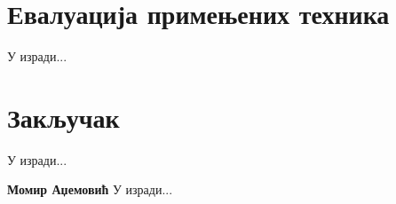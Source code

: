 \documentclass[11pt,oneside]{memoir}
\begin{document}
\chapter{Евалуација примењених техника}
\label{chp:razrada}

У изради...

\chapter{Закључак}
У изради...

\backmatter




\begin{biografija}
\textbf{Момир Аџемовић} 
У изради...
\end{biografija}
\end{document}
